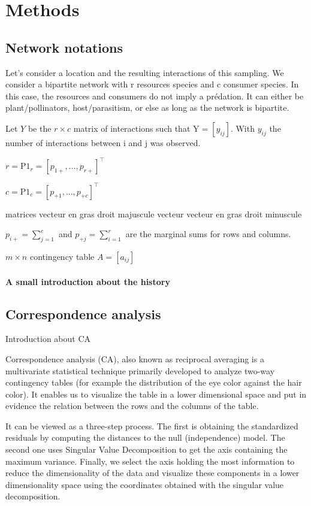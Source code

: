 \section{Methods}

\subsection{Network notations}
Let's consider a location and the resulting interactions of this sampling. We consider a bipartite network with r resources species and c consumer species. In this case, the resources and consumers do not imply a prédation. It can either be plant/pollinators, host/parasitism, or else as long as the network is bipartite. 

Let $Y$ be the $r\times c$ matrix of interactions such that $\textrm{Y} = [y_{ij}]$. With $y_{ij}$ the number of interactions between i and j was observed.

$r=\textrm{P1}_r =[p_{1+}, ..., p_{r+}]^\intercal$

$c=\textrm{P1}_c=[p_{+1}, ..., p_{+c}]^\intercal$

matrices vecteur en gras droit majuscule
vecteur vecteur en gras droit minuscule

$p_{i+}=\sum_{j=1}^{c}$ and $p_{+j}=\sum_{i=1}^{r}$ are the marginal sums for rows and columns.




$m\times n$ contingency table $A = [a_{ij}]$ 

\paragraph{A small introduction about the history}




\subsection{Correspondence analysis}

Introduction about CA

Correspondence analysis (CA), also known as reciprocal averaging is a multivariate statistical technique  primarily developed to analyze two-way contingency tables (for example the distribution of the eye color against the hair color). It enables us to visualize the table in a lower dimensional space and put in evidence the relation between the rows and the columns of the table.

It can be viewed as a three-step process. The first is obtaining the standardized residuals by computing the distances to the null (independence) model. The second one uses Singular Value Decomposition to get the axis containing the maximum variance. Finally, we select the axis holding the most information to reduce the dimensionality of the data and visualize these components in a lower dimensionality space using the coordinates obtained with the singular value decomposition.


